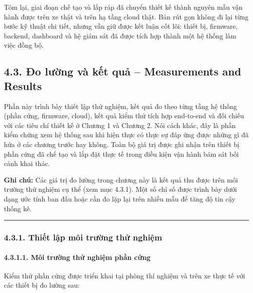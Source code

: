 \documentclass[a4paper]{extarticle}
\begin{document}
Tóm lại, giai đoạn chế tạo và lắp ráp đã chuyển thiết kế thành nguyên mẫu vận hành được trên xe thật và trên hạ tầng cloud thật. Bản rút gọn không đi lại từng bước kỹ thuật chi tiết, nhưng vẫn giữ được kết luận cốt lõi: thiết bị, firmware, backend, dashboard và hệ giám sát đã được tích hợp thành một hệ thống làm việc đồng bộ.

\subsection{4.3. Đo lường và kết quả -- Measurements and Results}\label{43-ux111o-lux1b0ux1eddng-vuxe0-kux1ebft-quux1ea3--measurements-and-results}

Phần này trình bày thiết lập thử nghiệm, kết quả đo theo từng tầng hệ
thống (phần cứng, firmware, cloud), kết quả kiểm thử tích hợp end-to-end
và đối chiếu với các tiêu chí thiết kế ở Chương 1 và Chương 2. Nói cách
khác, đây là phần kiểm chứng xem hệ thống sau khi hiện thực có thực sự
đáp ứng được những gì đã hứa ở các chương trước hay không. Toàn bộ giá
trị được ghi nhận trên thiết bị phần cứng đã chế tạo và lắp đặt thực tế
trong điều kiện vận hành bám sát bối cảnh khai thác.

\textbf{Ghi chú:} Các giá trị đo lường trong chương này là kết quả thu
được trên môi trường thử nghiệm cụ thể (xem mục 4.3.1). Một số chỉ số
được trình bày dưới dạng ước tính ban đầu hoặc cần đo lặp lại trên nhiều
mẫu để tăng độ tin cậy thống kê.

\begin{center}\rule{0.5\linewidth}{0.5pt}\end{center}

\subsubsection{4.3.1. Thiết lập môi trường thử
nghiệm}\label{431-thiux1ebft-lux1eadp-muxf4i-trux1b0ux1eddng-thux1eed-nghiux1ec7m}

\paragraph{4.3.1.1. Môi trường thử nghiệm phần
cứng}\label{4311-muxf4i-trux1b0ux1eddng-thux1eed-nghiux1ec7m-phux1ea7n-cux1ee9ng}

Kiểm thử phần cứng được triển khai tại phòng thí nghiệm và trên xe thực
tế với các thiết bị đo lường sau:
\end{document}
